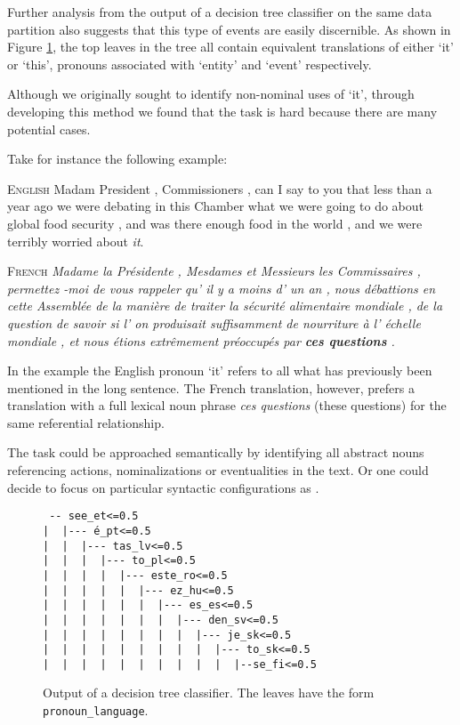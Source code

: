 \documentclass[10pt, a4paper]{article}
\begin{document}
Further analysis from the output of a decision tree classifier on the same data partition also suggests that this type of events are easily discernible. As shown in Figure \ref{fig:decisiontree}, the top leaves in the tree all contain equivalent translations of either `it' or `this', pronouns associated with `entity' and `event' respectively. 

Although we originally sought to identify non-nominal uses of `it', through developing this method we found that the task is hard because there are many potential
cases. 

Take for instance the following example:

\vspace{1em}

\textsc{English} Madam President , Commissioners , can I say to you that less than a year ago we were debating in this Chamber what we were going to do about global food security , and was there enough food in the world , and we were terribly worried about \textit{it}.

\textsc{French} \textit{Madame la Présidente , Mesdames et Messieurs les Commissaires , permettez -moi de vous rappeler qu' il y a moins d' un an , nous débattions en cette Assemblée de la manière de traiter la sécurité alimentaire mondiale , de la question de savoir si l' on produisait suffisamment de nourriture à l' échelle mondiale , et nous étions extrêmement préoccupés par \textbf{ces questions} .}

\vspace{1em}

In the example the English pronoun `it' refers to all what has previously been mentioned in the long sentence. The French translation, however, prefers a translation with a full lexical noun phrase \textit{ces questions} (these questions) for the same referential relationship. 

The task could be approached semantically by identifying all abstract
nouns referencing actions, nominalizations or eventualities in the text. Or one
could decide to focus on particular syntactic configurations as
.

\begin{figure}
\begin{verbatim}
 -- see_et<=0.5
|  |--- é_pt<=0.5
|  |  |--- tas_lv<=0.5
|  |  |  |--- to_pl<=0.5
|  |  |  |  |--- este_ro<=0.5
|  |  |  |  |  |--- ez_hu<=0.5
|  |  |  |  |  |  |--- es_es<=0.5
|  |  |  |  |  |  |  |--- den_sv<=0.5
|  |  |  |  |  |  |  |  |--- je_sk<=0.5
|  |  |  |  |  |  |  |  |  |--- to_sk<=0.5
|  |  |  |  |  |  |  |  |  |  |--se_fi<=0.5
\end{verbatim}
\caption{Output of a decision tree classifier. The leaves have the form \texttt{pronoun\_language}.}\label{fig:decisiontree}
\end{figure}
\end{document}
